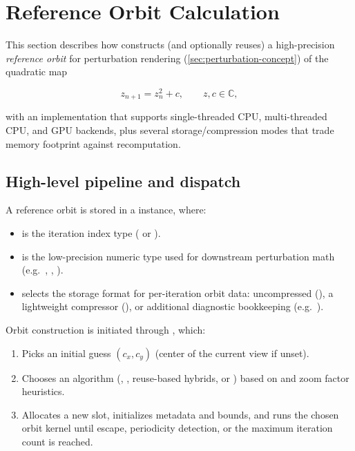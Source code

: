 \section{Reference Orbit Calculation}
\label{sec:ref-orbit-calc}

This section describes how  constructs (and optionally 
reuses) a high-precision \emph{reference orbit} for perturbation rendering (\cref{sec:perturbation-concept}) of 
the quadratic map

\begin{equation}
  z_{n+1} = z_n^2 + c,\qquad z,c\in\mathbb{C},
\end{equation}

with an implementation that supports single-threaded CPU, multi-threaded CPU,
and GPU backends, plus several storage/compression modes that trade memory
footprint against recomputation.

\subsection{High-level pipeline and dispatch}
\label{subsec:ref-orbit-pipeline}

A reference orbit is stored in a 
instance, where:

\begin{itemize}
  \item {} is the iteration index type ( or ).
  \item {} is the low-precision numeric type used for downstream perturbation math (e.g.\ ,
        , ).
  \item {} selects the storage format for per-iteration orbit data:
        uncompressed (), a lightweight compressor (),
        or additional diagnostic bookkeeping (e.g.\ ).
\end{itemize}

Orbit construction is initiated through , which:

\begin{enumerate}
  \item Picks an initial guess \((c_x,c_y)\) (center of the current view
        if unset).
  \item Chooses an algorithm (, , reuse-based hybrids,
        or ) based on  and zoom factor
        heuristics.
  \item Allocates a new  slot, initializes
        metadata and bounds, and runs the chosen orbit kernel until escape,
        periodicity detection, or the maximum iteration count is reached.
\end{enumerate}

